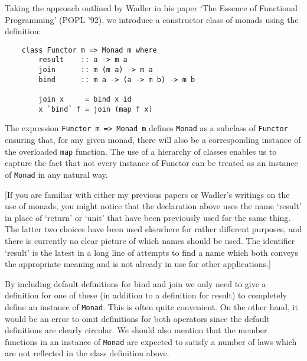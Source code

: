 Taking the approach outlined by Wadler in his paper `The Essence of
Functional Programming' (POPL '92), we introduce a constructor class of
monads using the definition:
\begin{verbatim}
    class Functor m => Monad m where
        result    :: a -> m a
        join      :: m (m a) -> m a
        bind      :: m a -> (a -> m b) -> m b

        join x     = bind x id
        x `bind` f = join (map f x)
\end{verbatim}
The expression \verb"Functor m => Monad m" defines \verb"Monad" as a subclass of
\verb"Functor" ensuring that, for any given monad, there will also be a
corresponding instance of the overloaded \verb"map" function.  The use of a
hierarchy of classes enables us to capture the fact that not every
instance of Functor can be treated as an instance of \verb"Monad" in any
natural way.

[If you are familiar with either my previous papers or Wadler's
writings on the use of monads, you might notice that the declaration
above uses the name `result' in place of `return' or `unit' that have
been previously used for the same thing.  The latter two choices have
been used elsewhere for rather different purposes, and there is
currently no clear picture of which names should be used.  The
identifier `result' is the latest in a long line of attempts to find a
name which both conveys the appropriate meaning and is not already in
use for other applications.]

By including default definitions for bind and join we only need to give
a definition for one of these (in addition to a definition for result)
to completely define an instance of \verb"Monad".  This is often quite
convenient.  On the other hand, it would be an error to omit
definitions for both operators since the default definitions are
clearly circular.  We should also mention that the member functions in
an instance of \verb"Monad" are expected to satisfy a number of laws which are
not reflected in the class definition above.

